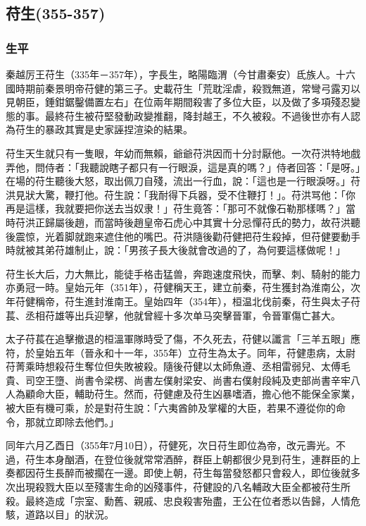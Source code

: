 
\subsection{苻生\tiny(355-357)}

\subsubsection{生平}

秦越厉王苻生（335年－357年），字長生，略陽臨渭（今甘肅秦安）氐族人。十六國時期前秦景明帝苻健的第三子。史載苻生「荒耽淫虐，殺戮無道，常彎弓露刃以見朝臣，錘鉗鋸鑿備置左右」在位兩年期間殺害了多位大臣，以及做了多項殘忍變態的事。最終苻生被苻堅發動政變推翻，降封越王，不久被殺。不過後世亦有人認為苻生的暴政其實是史家誣捏渲染的結果。

苻生天生就只有一隻眼，年幼而無賴，爺爺苻洪因而十分討厭他。一次苻洪特地戲弄他，問侍者：「我聽說瞎子都只有一行眼淚，這是真的嗎？」侍者回答：「是呀。」在場的苻生聽後大怒，取出佩刀自殘，流出一行血，說：「這也是一行眼淚呀。」苻洪見狀大驚，鞭打他。苻生說：「我耐得下兵器，受不住鞭打！」。苻洪骂他：「你再是這樣，我就要把你送去当奴隶！」苻生竟答：「那可不就像石勒那樣嗎？」當時苻洪正歸屬後趙，而當時後趙皇帝石虎心中其實十分忌憚苻氏的勢力，故苻洪聽後震惊，光着脚就跑来遮住他的嘴巴。苻洪隨後勸苻健把苻生殺掉，但苻健要動手時就被其弟苻雄制止，說：「男孩子長大後就會改過的了，為何要這樣做呢！」

苻生长大后，力大無比，能徒手格击猛兽，奔跑速度飛快，而擊、刺、騎射的能力亦勇冠一時。皇始元年（351年），苻健稱天王，建立前秦，苻生獲封為淮南公，次年苻健稱帝，苻生進封淮南王。皇始四年（354年），桓温北伐前秦，苻生與太子苻萇、丞相苻雄等出兵迎擊，他就曾經十多次单马突擊晉軍，令晉軍傷亡甚大。

太子苻萇在追擊撤退的桓溫軍隊時受了傷，不久死去，苻健以讖言「三羊五眼」應符，於皇始五年（晉永和十一年，355年）立苻生為太子。同年，苻健患病，太尉苻菁乘時想殺苻生奪位但失敗被殺。隨後苻健以太師魚遵、丞相雷弱兒、太傅毛貴、司空王墮、尚書令梁楞、尚書左僕射梁安、尚書右僕射段純及吏部尚書辛牢八人為顧命大臣，輔助苻生。然而，苻健慮及苻生凶暴嗜酒，擔心他不能保全家業，被大臣有機可乘，於是對苻生說：「六夷酋帥及掌權的大臣，若果不遵從你的命令，那就立即除去他們。」

同年六月乙酉日（355年7月10日），苻健死，次日苻生即位為帝，改元壽光。不過，苻生本身酗酒，在登位後就常常酒醉，群臣上朝都很少見到苻生，連群臣的上奏都因苻生長醉而被擱在一邊。即使上朝，苻生每當發怒都只會殺人，即位後就多次出現殺戮大臣以至殘害生命的凶殘事件，苻健設的八名輔政大臣全都被苻生所殺。最終造成「宗室、勳舊、親戚、忠良殺害殆盡，王公在位者悉以告歸，人情危駭，道路以目」的狀況。

